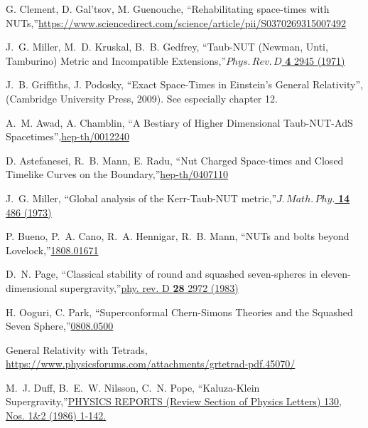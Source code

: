 \documentclass[12pt, a4paper]{article}
\numberwithin{equation}{section}
\begin{document}
\begin{thebibliography}{10}
G. Clement, D. Gal'tsov, M. Guenouche, ``{Rehabilitating space-times with NUTs},''\href{https://www.sciencedirect.com/science/article/pii/S0370269315007492}{https://www.sciencedirect.com/science/article/pii/S0370269315007492}

J.~G. Miller, M.~D. Kruskal, B.~B. Gedfrey, ``{Taub-NUT (Newman, Unti, Tamburino) Metric and Incompatible Extensions},''\href{https://journals.aps.org/prd/abstract/10.1103/PhysRevD.4.2945}{$Phys.\,Rev.\, D$\textbf{ 4} 2945 (1971)}

J.~B. Griffiths, J. Podosky, ``{Exact Space-Times in Einstein's General Relativity}'', (Cambridge University Press, 2009). See especially chapter 12.

A.~M. Awad, A. Chamblin, ``{A Bestiary of Higher Dimensional Taub-NUT-AdS Spacetimes}'',\href{https://arxiv.org/abs/hep-th/0012240}{hep-th/0012240}

D. Astefanesei, R.~B. Mann, E. Radu, ``{Nut Charged Space-times and Closed Timelike Curves on the Boundary},''\href{https://arxiv.org/abs/hep-th/0407110}{hep-th/0407110}

J.~G. Miller, ``{Global analysis of the Kerr-Taub-NUT metric},''\href{https://aip.scitation.org/doi/10.1063/1.1666343}{$J.\,Math.\,Phy.$ \textbf{14} 486 (1973)}

P. Bueno, P.~A. Cano, R.~A. Hennigar, R.~B. Mann, ``{NUTs and bolts beyond Lovelock},''\href{https://arxiv.org/abs/1808.01671}{1808.01671}

D.~N. Page, ``{Classical stability of round and squashed seven-spheres in eleven-dimensional supergravity},''\href{https://journals.aps.org/prd/pdf/10.1103/PhysRevD.28.2976}{phy. rev. D \textbf{28} 2972 (1983)}

H. Ooguri, C. Park, ``{Superconformal Chern-Simons Theories
	and the Squashed Seven Sphere},''\href{https://arxiv.org/abs/0808.0500}{0808.0500}

General Relativity with Tetrads, \href{https://www.physicsforums.com/attachments/grtetrad-pdf.45070/}{https://www.physicsforums.com/attachments/grtetrad-pdf.45070/}

M.~J. Duff, B.~E.~W. Nilsson, C.~N. Pope, ``{Kaluza-Klein Supergravity},''\href{https://www.sciencedirect.com/science/article/abs/pii/0370157386901638}{PHYSICS REPORTS (Review Section of Physics Letters) 130, Nos. 1\&2 (1986) 1-142.}


\end{thebibliography}
\end{document}
